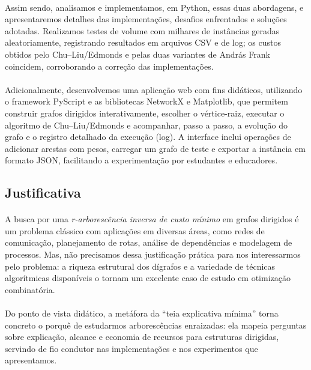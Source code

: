 \documentclass[12pt,a4paper]{article}
\begin{document}
\paragraph{}
Assim sendo, analisamos e implementamos, em Python, essas duas abordagens, e apresentaremos detalhes das implementações, desafios enfrentados e soluções adotadas. Realizamos testes de volume com milhares de instâncias geradas aleatoriamente, registrando resultados em arquivos CSV e de log; os custos obtidos pelo Chu--Liu/Edmonds e pelas duas variantes de András Frank coincidem, corroborando a correção das implementações.

\paragraph{}
Adicionalmente, desenvolvemos uma aplicação web com fins didáticos, utilizando o framework PyScript e as bibliotecas NetworkX e Matplotlib, que permitem construir grafos dirigidos interativamente, escolher o vértice-raiz, executar o algoritmo de Chu--Liu/Edmonds e acompanhar, passo a passo, a evolução do grafo e o registro detalhado da execução (log). A interface inclui operações de adicionar arestas com pesos, carregar um grafo de teste e exportar a instância em formato JSON, facilitando a experimentação por estudantes e educadores.

\subsection{Justificativa}

\paragraph{}
A busca por uma \textit{r-arborescência inversa de custo mínimo} em grafos dirigidos é um problema clássico com aplicações em diversas áreas, como redes de comunicação, planejamento de rotas, análise de dependências e modelagem de processos. Mas, não precisamos dessa justificação prática para nos interessarmos pelo problema: a riqueza estrutural dos dígrafos e a variedade de técnicas algorítmicas disponíveis o tornam um excelente caso de estudo em otimização combinatória.

\paragraph{}
Do ponto de vista didático, a metáfora da “teia explicativa mínima” torna concreto o porquê de estudarmos arborescências enraizadas: ela mapeia perguntas sobre explicação, alcance e economia de recursos para estruturas dirigidas, servindo de fio condutor nas implementações e nos experimentos que apresentamos.
\end{document}

